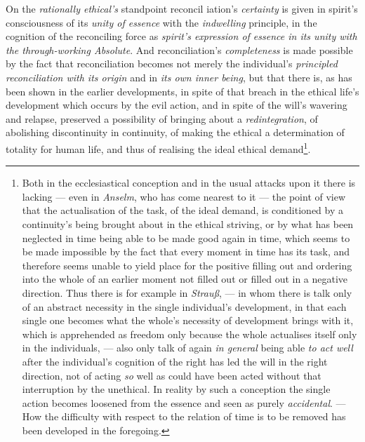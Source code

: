 \documentclass[12pt,a4paper]{book}
\begin{document}
On the \emph{rationally ethical's} standpoint reconcil\-%
\setcounter{footnote}{0}%
iation's \emph{certainty} is given in spirit's consciousness of its \emph{unity
of essence} with the \emph{indwelling} principle, in the cognition of the
reconciling force as \emph{spirit's expression of essence in its unity with the
through-working Absolute}. And reconciliation's \emph{completeness} is made
possible by the fact that reconciliation becomes not merely the individual's
\emph{principled reconciliation with its origin} and in \emph{its own inner
being}, but that there is, as has been shown in the earlier developments, in
spite of that breach in the ethical life's development which occurs by the evil
action, and in spite of the will's wavering and relapse, preserved a possibility
of bringing about a \emph{redintegration}, of abolishing discontinuity in
continuity, of making the ethical a determination of totality for human life,
and thus of realising the ideal ethical demand\footnote{Both in the
ecclesiastical conception and in the usual attacks upon it there is lacking ---
even in \emph{Anselm}, who has come nearest to it --- the point of view that the
actualisation of the task, of the ideal demand, is conditioned by a continuity's
being brought about in the ethical striving, or by what has been neglected in
time being able to be made good again in time, which seems to be made impossible
by the fact that every moment in time has its task, and therefore seems unable
to yield place for the positive filling out and ordering into the whole of an
earlier moment not filled out or filled out in a negative direction. Thus there
is for example in \emph{Strauß}, --- in whom there is talk only of an abstract
necessity in the single individual's development, in that each single one
becomes what the whole's necessity of development brings with it, which is
apprehended as freedom only because the whole actualises itself only in the
individuals, --- also only talk of again \emph{in general} being able \emph{to
act well} after the individual's cognition of the right has led the will in the
right direction, not of acting \emph{so} well as could have been acted without
that interruption by the unethical. In reality by such a conception the single
action becomes loosened from the essence and seen as purely \emph{accidental}.
--- How the difficulty with respect to the relation of time is to be removed has
been developed in the foregoing.}.
\end{document}
